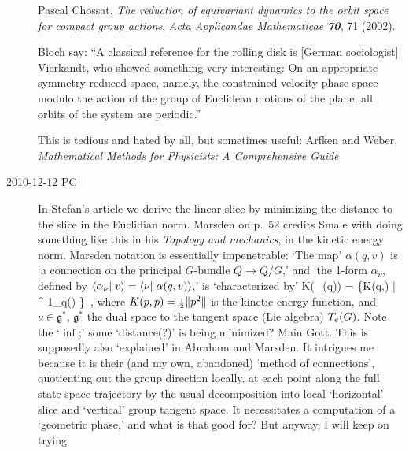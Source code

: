 \begin{description}
Pascal Chossat,
{\emph{The reduction of equivariant dynamics}}
\emph{to the orbit space for compact group actions},
{\em Acta Applicandae Mathematicae \bf 70}, 71 (2002). %

     {Bloch \etal} say:
``A classical reference for the rolling disk is [German
sociologist]
{Vierkandt}, who showed
something very interesting: On an appropriate
symmetry-reduced space, namely, the constrained velocity
phase space modulo the action of the group of Euclidean
motions of the plane, all orbits of the system are
periodic.''

This is tedious and hated by all, but sometimes useful:
Arfken and Weber,
\emph{Mathematical Methods for Physicists: A Comprehensive Guide
}


\item[2010-12-12 PC]
													\toCB
In  Stefan's article we derive the linear slice by minimizing
the distance to the slice in the Euclidian norm. Marsden on
p.~52 credits Smale with doing something
like this in his
{\emph{Topology and mechanics}}, in the kinetic energy norm.
Marsden notation is essentially
impenetrable:
`The map' $\alpha(q,v)$ is `a connection on the principal $G$-bundle $Q
\to Q/G$,' and `the 1-form $\alpha_\nu$, defined by
$\braket{\alpha_\nu}{v} = \braket{\nu}{\alpha(q,v)}$,'
is `characterized by'
\beq
K(\alpha_\nu(q))
= \inf \left\{K(q,\beta) \;|\; \beta \in {}^{-1}_q(\nu) \right\}
\,,
where $K(p,p) = {\scriptstyle{1\over2}} \| p^2 \|$ is the kinetic energy function,
and $\nu \in \mathfrak{g}^*$, $\mathfrak{g}^*$ the dual space to
the tangent space (Lie algebra) $T_e(G)$.
Note the `$\inf$;' some `distance(?)' is being minimized? Main Gott.
This is supposedly also `explained' in Abraham and Marsden.
It intrigues me because it is their (and my own, abandoned) `method of
connections', quotienting out the group direction locally, at each point
along the full state-space trajectory by the usual decomposition into
local `horizontal' slice and `vertical' group tangent space. It
necessitates a computation of a `geometric phase,' and what is that good for?
But anyway, I will keep on trying.




\end{description}
